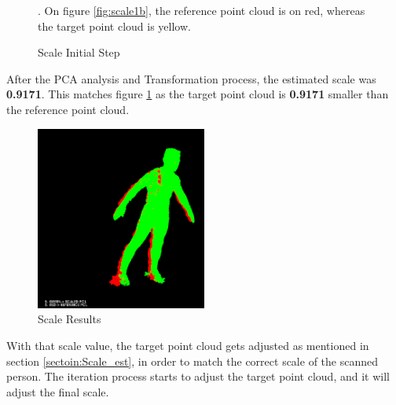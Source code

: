 \documentclass[12pt]{report}
\begin{document}
\begin{figure}[H]%
  \centering
  \qquad
  \qquad
\caption{Scale Initial Step}. On figure \ref{fig:scale1b}, the reference point cloud is on red, whereas the target point cloud is yellow.
\label{fig:scale1} 
\end{figure}
 
After the PCA analysis and Transformation process, the estimated scale was \textbf{0.9171}. 
This matches figure \ref{fig:scale1} as the target point cloud is \textbf{0.9171} smaller than the reference point cloud.

\newpage

\begin{figure}
  \begin{center}
    \includegraphics[width=0.5\textwidth]{scaledexample.png}
  \end{center}
  \caption{Scale Results}
  \label{fig:scale_res1}
\end{figure}
With that scale value, the target point cloud gets adjusted as mentioned in section \ref{sectoin:Scale_est}, in order to match the correct scale of the scanned person. 
The iteration process starts to adjust the target point cloud, and it will adjust the final scale. 
\end{document}
